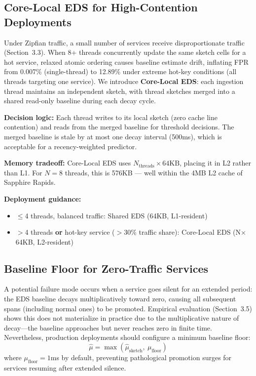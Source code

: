 \documentclass[sigconf,nonacm]{acmart}
\begin{document}
\subsection{Core-Local EDS for High-Contention Deployments}

Under Zipfian traffic, a small number of services receive disproportionate
traffic (Section~3.3). When 8+ threads concurrently update the same sketch
cells for a hot service, relaxed atomic ordering causes baseline estimate
drift, inflating FPR from 0.007\% (single-thread) to 12.89\% under extreme
hot-key conditions (all threads targeting one service). We introduce
\textbf{Core-Local EDS}: each ingestion thread maintains an independent
sketch, with thread sketches merged into a shared read-only baseline during
each decay cycle.

\textbf{Decision logic:} Each thread writes to its local sketch (zero cache
line contention) and reads from the merged baseline for threshold decisions.
The merged baseline is stale by at most one decay interval (500ms), which is
acceptable for a recency-weighted predictor.

\textbf{Memory tradeoff:} Core-Local EDS uses $N_{\text{threads}} \times
64\text{KB}$, placing it in L2 rather than L1. For $N=8$ threads, this is
576KB — well within the 4MB L2 cache of Sapphire Rapids.

\textbf{Deployment guidance:}
\begin{itemize}
  \item $\leq$4 threads, balanced traffic: Shared EDS (64KB, L1-resident)
  \item $>$4 threads \textbf{or} hot-key service ($>$30\% traffic share):
        Core-Local EDS (N$\times$64KB, L2-resident)
\end{itemize}

\subsection{Baseline Floor for Zero-Traffic Services}

A potential failure mode occurs when a service goes silent for an extended period: the
EDS baseline decays multiplicatively toward zero, causing all subsequent spans (including
normal ones) to be promoted. Empirical evaluation (Section~3.5) shows this does not
materialize in practice due to the multiplicative nature of decay—the baseline
approaches but never reaches zero in finite time. Nevertheless, production deployments
should configure a minimum baseline floor:
\[
  \hat{\mu} = \max(\hat{\mu}_{\text{sketch}},\ \mu_{\text{floor}})
\]
where $\mu_{\text{floor}} = 1$ms by default, preventing pathological promotion surges
for services resuming after extended silence.
\end{document}
